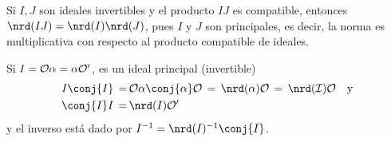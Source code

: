
\begin{obsNormaEsMultiplicativa}
Si $I,J$ son ideales invertibles y el producto $IJ$ es compatible,
entonces $\nrd(IJ)=\nrd(I)\nrd(J)$, pues $I$ y $J$ son principales,
es decir, la norma es multiplicativa con respecto al producto compatible
de ideales.
\end{obsNormaEsMultiplicativa}

\begin{obsConjugadosEInversos}
Si $I=\cal{O}\alpha=\alpha\cal{O}'$, es un ideal principal (invertible)
\begin{align*}
	I\conj{I} \,=\, & \cal{O}\alpha\conj{\alpha}\cal{O}\,=\,
	\nrd(\alpha)\cal{O}\,=\,\nrd(I)\cal{O}\quad\text{y} \\
	\conj{I}I \,=\, & \nrd(I)\cal{O}'
\end{align*}
%
y el inverso est\'{a} dado por $I^{-1}=\nrd(I)^{-1}\conj{I}$.


\end{obsConjugadosEInversos}
